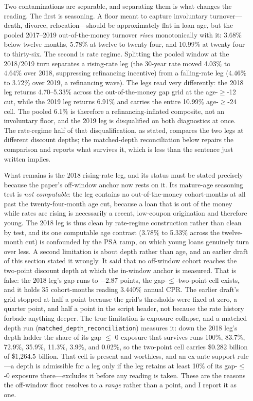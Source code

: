 \documentclass[12pt]{article}
\begin{document}
Two contaminations are separable, and separating them is what changes the reading. The first is seasoning. A floor meant to capture involuntary turnover---death, divorce, relocation---should be approximately flat in loan age, but the pooled 2017--2019 out-of-the-money turnover \emph{rises} monotonically with it: 3.68\% below twelve months, 5.78\% at twelve to twenty-four, and 10.99\% at twenty-four to thirty-six. The second is rate regime. Splitting the pooled window at the 2018/2019 turn separates a rising-rate leg (the 30-year rate moved 4.03\% to 4.64\% over 2018, suppressing refinancing incentive) from a falling-rate leg (4.46\% to 3.72\% over 2019, a refinancing wave). The legs read very differently: the 2018 leg returns 4.70--5.33\% across the out-of-the-money gap grid at the age-$\geq$-12 cut, while the 2019 leg returns 6.91\% and carries the entire 10.99\% age-$\geq$-24 cell. The pooled 6.1\% is therefore a refinancing-inflated composite, not an involuntary floor, and the 2019 leg is disqualified on both diagnostics at once. The rate-regime half of that disqualification, as stated, compares the two legs at different discount depths; the matched-depth reconciliation below repairs the comparison and reports what survives it, which is less than the sentence just written implies.

What remains is the 2018 rising-rate leg, and its status must be stated precisely because the paper's off-window anchor now rests on it. Its mature-age seasoning test is \emph{not computable}: the leg contains no out-of-the-money cohort-months at all past the twenty-four-month age cut, because a loan that is out of the money while rates are rising is necessarily a recent, low-coupon origination and therefore young. The 2018 leg is thus clean by rate-regime construction rather than clean by test, and its one computable age contrast (3.78\% to 5.33\% across the twelve-month cut) is confounded by the PSA ramp, on which young loans genuinely turn over less. A second limitation is about depth rather than age, and an earlier draft of this section stated it wrongly. It said that no off-window cohort reaches the two-point discount depth at which the in-window anchor is measured. That is false: the 2018 leg's gap runs to $-2.87$ points, the gap-$\leq$-two-point cell exists, and it holds 35 cohort-months reading 3.440\% annual CPR. The earlier draft's grid stopped at half a point because the grid's thresholds were fixed at zero, a quarter point, and half a point in the script header, not because the rate history forbade anything deeper. The true limitation is exposure collapse, and a matched-depth run (\texttt{matched\_depth\_reconciliation}) measures it: down the 2018 leg's depth ladder the share of its gap-$\leq$-0 exposure that survives runs 100\%, 83.7\%, 72.9\%, 35.9\%, 11.3\%, 3.9\%, and 0.02\%, so the two-point cell carries \$0.282 billion of \$1{,}264.5 billion. That cell is present and worthless, and an ex-ante support rule---a depth is admissible for a leg only if the leg retains at least 10\% of its gap-$\leq$-0 exposure there---excludes it before any reading is taken. These are the reasons the off-window floor resolves to a \emph{range} rather than a point, and I report it as one.
\end{document}
